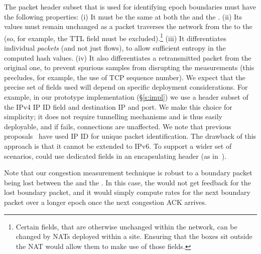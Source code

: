 The packet header subset that is used for identifying epoch boundaries must have the following properties:
(i) It must be the same at both the \inbox and the \outbox.
(ii) Its values must remain unchanged as a packet traverses the network from the \inbox to the \outbox (so, for example, the TTL field must be excluded).\footnote{Certain fields, that are otherwise unchanged within the network, can be changed by NATs deployed within a site. Ensuring that the \name boxes sit outside the NAT would allow them to make use of those fields.}
(iii) It differentiates individual \emph{packets} (and not just flows), to allow sufficient entropy in the computed hash values.
(iv) It also differentiates a retransmitted packet from the original one, to prevent spurious samples from disrupting the measurements (this precludes, for example, the use of TCP sequence number).
%
We expect that the precise set of fields used will depend on specific deployment considerations.
For example, in our prototype implementation (\S\ref{s:impl}) we use a header subset of the IPv4 IP ID field and destination IP and port. 
We make this choice for simplicity; it does not require tunnelling mechanisms and is thus easily deployable, and if \name fails, connections are unaffected. 
We note that previous proposals~\cite{ip-traceback} have used IP ID for unique packet identification. 
The drawback of this approach is that it cannot be extended to IPv6.
To support a wider set of scenarios, \name could use dedicated fields in an encapsulating header (as in~\cite{axe}).

Note that our congestion measurement technique is robust to a boundary packet being lost between the \inbox and the \outbox. In this case, the \inbox would not get feedback for the lost boundary packet, and it would simply compute rates for the next boundary packet over a longer epoch once the next congestion ACK arrives.



